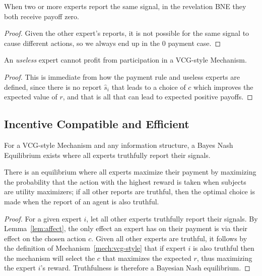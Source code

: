 \begin{prop}
	When two or more experts report the same signal, in the revelation BNE they both receive payoff zero. 
\end{prop}

\begin{proof}
	Given the other expert's reports, it is not possible for the same signal to cause different actions, so we always end up in the 0 payment case.
\end{proof}


\begin{prop}
	An \emph{useless} expert cannot profit from participation in a VCG-style Mechanism.
\end{prop}

\begin{proof}
	This is immediate from how the payment rule and useless experts are defined, since there is no report $\hat{s}_i$ that leads to a choice of $c$ which improves the expected value of $r$, and that is all that can lead to expected positive payoffs.
\end{proof}


\subsection{Incentive Compatible and Efficient}

\begin{thm}
	For a VCG-style Mechanism and any information structure, a Bayes Nash Equilibrium exists where all experts truthfully report their signals.
\end{thm}

There is an equilibrium where all experts maximize their payment by maximizing the probability that the action with the highest reward is taken when subjects are utility maximizers; if all other reports are truthful, then the optimal choice is made when the report of an agent is also truthful.

\begin{proof}
For a given expert $i$, let all other experts truthfully report their signals. By Lemma~\ref{lem:affect}, the only effect an expert has on their payment is via their effect on the chosen action $c$. Given all other experts are truthful, it follows by the definition of Mechanism~\ref{mech:vcg-style} that if expert $i$ is also truthful then the mechanism will select the $c$ that maximizes the expected $r$, thus maximizing the expert $i$'s reward. Truthfulness is therefore a Bayesian Nash equilibrium.
\end{proof}


